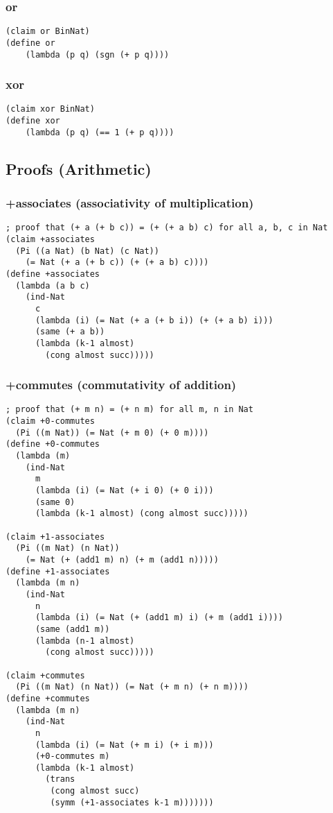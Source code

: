 \subsubsection{or} \label{code:or}
\begin{lstlisting}
(claim or BinNat)
(define or
    (lambda (p q) (sgn (+ p q))))
\end{lstlisting}

\subsubsection{xor} \label{code:xor}
\begin{lstlisting}
(claim xor BinNat)
(define xor
    (lambda (p q) (== 1 (+ p q))))
\end{lstlisting}


\subsection{Proofs (Arithmetic)}

\subsubsection{+associates (associativity of multiplication)} \label{code:+associates}
\begin{lstlisting}
; proof that (+ a (+ b c)) = (+ (+ a b) c) for all a, b, c in Nat
(claim +associates
  (Pi ((a Nat) (b Nat) (c Nat))
    (= Nat (+ a (+ b c)) (+ (+ a b) c))))
(define +associates
  (lambda (a b c)
    (ind-Nat
      c
      (lambda (i) (= Nat (+ a (+ b i)) (+ (+ a b) i)))
      (same (+ a b))
      (lambda (k-1 almost)
        (cong almost succ)))))
\end{lstlisting}

\subsubsection{+commutes (commutativity of addition)} \label{code:+commutes}
\begin{lstlisting}
; proof that (+ m n) = (+ n m) for all m, n in Nat
(claim +0-commutes
  (Pi ((m Nat)) (= Nat (+ m 0) (+ 0 m))))
(define +0-commutes
  (lambda (m)
    (ind-Nat
      m
      (lambda (i) (= Nat (+ i 0) (+ 0 i)))
      (same 0)
      (lambda (k-1 almost) (cong almost succ)))))

(claim +1-associates
  (Pi ((m Nat) (n Nat))
    (= Nat (+ (add1 m) n) (+ m (add1 n)))))
(define +1-associates
  (lambda (m n)
    (ind-Nat
      n
      (lambda (i) (= Nat (+ (add1 m) i) (+ m (add1 i))))
      (same (add1 m))
      (lambda (n-1 almost)
        (cong almost succ)))))

(claim +commutes
  (Pi ((m Nat) (n Nat)) (= Nat (+ m n) (+ n m))))
(define +commutes
  (lambda (m n)
    (ind-Nat
      n
      (lambda (i) (= Nat (+ m i) (+ i m)))
      (+0-commutes m)
      (lambda (k-1 almost)
        (trans
         (cong almost succ)
         (symm (+1-associates k-1 m)))))))
\end{lstlisting}

